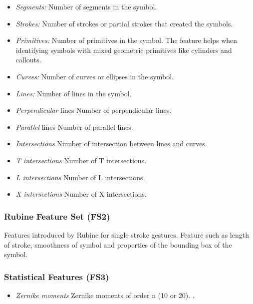 \documentclass{article}
\begin{document}
 \begin{itemize}
	 \item \emph{Segments:} Number of segments in the symbol.
	 \item \emph{Strokes:} Number of strokes or partial strokes that created the symbols.  
		\item  \emph{Primitives:} Number of primitives in the symbol. The feature helps when identifying             symbols with mixed geometric primitives like cylinders and callouts.  
		\item \emph{Curves:} Number of curves or ellipses in the symbol. 
		\item \emph{Lines:} Number of lines in the symbol. 
		\item \emph{Perpendicular} lines Number of perpendicular lines. 
		\item \emph{Parallel} lines Number of parallel lines. 
		\item \emph{Intersections} Number of intersection between lines and curves. 
		\item \emph{T intersections} Number of T intersections. 
		\item \emph{L intersections} Number of L intersections. 
		\item \emph{X intersections} Number of X intersections.
	
\end{itemize}
\subsubsection{Rubine Feature Set (FS2)}
  Features introduced by Rubine\cite{gestureexample12} for single stroke gestures. Feature such as length of stroke, smoothness of symbol and properties of the bounding box of the symbol. 
  
\subsubsection{Statistical Features (FS3)}  
\begin{itemize}
	\item \emph{Zernike moments } Zernike moments of order n (10 or 20).  \cite{HeloiseBeautification}. 
\end{itemize}
\end{document}
